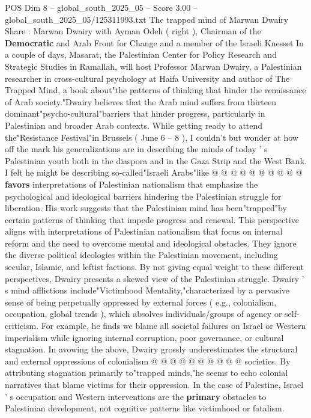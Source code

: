 \begin{textsample}{POS Dim 8 – global\_south\_2025\_05 – Score 3.00 – global\_south\_2025\_05/125311993.txt}  \label{ex:f8_pos_441}
The trapped mind of Marwan Dwairy Share : Marwan Dwairy with Ayman Odeh ( right ), Chairman of the \textbf{Democratic} and Arab Front for Change and a member of the Israeli Knesset In a couple of days, Masarat, the Palestinian Center for Policy Research and Strategic Studies in Ramallah, will host Professor Marwan Dwairy, a Palestinian researcher in cross-cultural psychology at Haifa University and author of The Trapped Mind, a book about"the patterns of thinking that hinder the renaissance of Arab society."Dwairy believes that the Arab mind suffers from thirteen dominant"psycho-cultural"barriers that hinder progress, particularly in Palestinian and broader Arab contexts.
While getting ready to attend the"Resistance Festival"in Brussels ( June 6 -- 8 ), I couldn't but wonder at how off the mark his generalizations are in describing the minds of today ' s Palestinian youth both in the diaspora and in the Gaza Strip and the West Bank.
I felt he might be describing so-called"Israeli Arabs"like @ @ @ @ @ @ @ @ @ @ \textbf{favors} interpretations of Palestinian nationalism that emphasize the psychological and ideological barriers hindering the Palestinian struggle for liberation.
His work suggests that the Palestinian mind has been"trapped"by certain patterns of thinking that impede progress and renewal.
This perspective aligns with interpretations of Palestinian nationalism that focus on internal reform and the need to overcome mental and ideological obstacles.
They ignore the diverse political ideologies within the Palestinian movement, including secular, Islamic, and leftist factions.
By not giving equal weight to these different perspectives, Dwairy presents a skewed view of the Palestinian struggle.
Dwairy ' s mind afflictions include"Victimhood Mentality,"characterized by a pervasive sense of being perpetually oppressed by external forces ( e.g., colonialism, occupation, global trends ), which absolves individuals/groups of agency or self-criticism.
For example, he finds we blame all societal failures on Israel or Western imperialism while ignoring internal corruption, poor governance, or cultural stagnation.
In avowing the above, Dwairy grossly underestimates the structural and external oppressions of colonialism @ @ @ @ @ @ @ @ @ @ societies.
By attributing stagnation primarily to"trapped minds,"he seems to echo colonial narratives that blame victims for their oppression.
In the case of Palestine, Israel ' s occupation and Western interventions are the \textbf{primary} obstacles to Palestinian development, not cognitive patterns like victimhood or fatalism.

\end{textsample}
